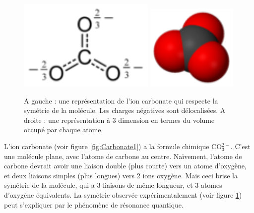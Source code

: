 \begin{figure}[h!]
\begin{center}
\includegraphics[width=0.2\columnwidth]{Pictures/Carbonate2.pdf} 
\quad \quad
\includegraphics[width=0.13\columnwidth]{Pictures/Carbonate3.pdf} 
\end{center}
\caption{A gauche : une représentation de l'ion carbonate qui respecte la symétrie de la molécule. Les charges négatives sont délocalisées. A droite : une représentation à 3 dimension en termes du volume occupé par chaque atome.
}
\label{fig:Carbonate2}
\end{figure}



L'ion carbonate (voir figure \ref{fig:Carbonate1}) a la formule chimique CO$_3^{2-}$. C'est une molécule plane, avec l'atome de carbone au centre. Naïvement, l'atome de carbone devrait avoir une liaison double (plus courte) vers un atome d'oxygène, et deux liaisons simples (plus longues) vers 2 ions oxygène. Mais ceci brise la symétrie de la molécule, qui a 3 liaisons de même longueur, et 3 atomes d'oxygène équivalents. La symétrie observée expérimentalement (voir figure \ref{fig:Carbonate2}) peut s'expliquer par le phénomène de résonance quantique. \\


